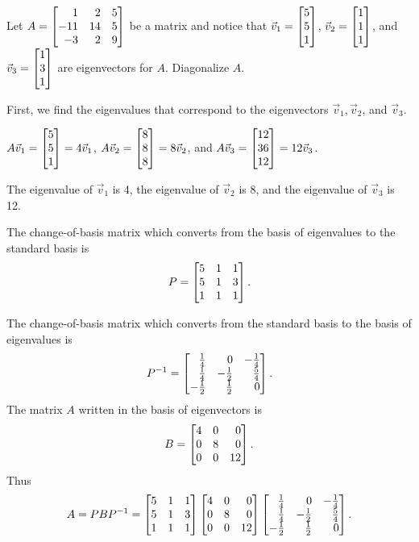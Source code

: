 \begin{example}
	Let $A=\mat{1&2&5\\-11&14&5\\-3&2&9}$ be a matrix and notice that $\vec v_1=\mat{5\\5\\1}$, $\vec v_2=\mat{1\\1\\1}$,
	and $\vec v_3=\mat{1\\3\\1}$ are eigenvectors for $A$. Diagonalize $A$.

	First, we find the eigenvalues that correspond to the eigenvectors $\vec v_1, \vec v_2$, 
	and $\vec v_3$. 
	
	$A\vec v_1=\mat{5\\5\\1}=4\vec v_1$, $A\vec v_2=\mat{8\\8\\8}=8\vec v_2$, and
	$A\vec v_3=\mat{12\\36\\12}=12\vec v_3$. 
	
	The eigenvalue of $\vec v_1$ is 4, the eigenvalue of $\vec v_2$ is 8, 
	and the eigenvalue of $\vec v_3$ is 12.
	
	The change-of-basis matrix which converts from the basis of eigenvalues to the standard basis is
	\[
		P = \mat{5&1&1\\5&1&3\\1&1&1}.
	\]
	
	The change-of-basis matrix which converts from the standard basis to the basis
	of eigenvalues is
	\[
		P^{-1} = \mat{\frac{1}{4}&0&-\frac{1}{4}\\\frac{1}{4}&-\frac{1}{2}&\frac{5}{4}\\-\frac{1}{2}&\frac{1}{2}&0}.
	\]
	The matrix $A$ written in the basis of eigenvectors is
	\[
		B = \mat{4&0&0\\0&8&0\\0&0&12}.
	\]
	Thus
	\[
		A = PBP^{-1}= \mat{5&1&1\\5&1&3\\1&1&1}\mat{4&0&0\\0&8&0\\0&0&12}
		\mat{\frac{1}{4}&0&-\frac{1}{4}\\\frac{1}{4}&-\frac{1}{2}&\frac{5}{4}\\-\frac{1}{2}&\frac{1}{2}&0}.
	\]
\end{example}


